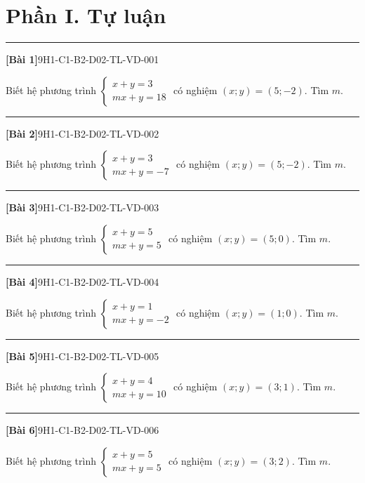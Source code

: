 \documentclass[12pt,a4paper]{article}
\newif\ifloigiai
\newenvironment{cauhoi}[2]{%
  \par\medskip\noindent\rule{\textwidth}{0.4pt}\par\nopagebreak
  \noindent\textbf{[#1]}\hfill{\scriptsize\ttfamily #2}\par\nopagebreak\smallskip}{\par}
\newcommand{\loigiai}[1]{\ifloigiai\par\smallskip\noindent\textit{Lời giải.} #1\par\fi}
\begin{document}
\section*{Phần I. Tự luận}
\begin{cauhoi}{Bài 1}{9H1-C1-B2-D02-TL-VD-001}
Biết hệ phương trình $\begin{cases}x+y=3\\ mx+y=18\end{cases}$ có nghiệm $(x;y)=(5;-2)$. Tìm $m$.
\loigiai{Thay $x=5$, $y=-2$ vào phương trình thứ hai: $5 m-2=18$ nên $m=\dfrac{18+2}{5}=4$.}
\end{cauhoi}
\begin{cauhoi}{Bài 2}{9H1-C1-B2-D02-TL-VD-002}
Biết hệ phương trình $\begin{cases}x+y=3\\ mx+y=-7\end{cases}$ có nghiệm $(x;y)=(5;-2)$. Tìm $m$.
\loigiai{Thay $x=5$, $y=-2$ vào phương trình thứ hai: $5 m-2=-7$ nên $m=\dfrac{-7+2}{5}=-1$.}
\end{cauhoi}
\begin{cauhoi}{Bài 3}{9H1-C1-B2-D02-TL-VD-003}
Biết hệ phương trình $\begin{cases}x+y=5\\ mx+y=5\end{cases}$ có nghiệm $(x;y)=(5;0)$. Tìm $m$.
\loigiai{Thay $x=5$, $y=0$ vào phương trình thứ hai: $5 m+0=5$ nên $m=\dfrac{5-0}{5}=1$.}
\end{cauhoi}
\begin{cauhoi}{Bài 4}{9H1-C1-B2-D02-TL-VD-004}
Biết hệ phương trình $\begin{cases}x+y=1\\ mx+y=-2\end{cases}$ có nghiệm $(x;y)=(1;0)$. Tìm $m$.
\loigiai{Thay $x=1$, $y=0$ vào phương trình thứ hai: $1 m+0=-2$ nên $m=\dfrac{-2-0}{1}=-2$.}
\end{cauhoi}
\begin{cauhoi}{Bài 5}{9H1-C1-B2-D02-TL-VD-005}
Biết hệ phương trình $\begin{cases}x+y=4\\ mx+y=10\end{cases}$ có nghiệm $(x;y)=(3;1)$. Tìm $m$.
\loigiai{Thay $x=3$, $y=1$ vào phương trình thứ hai: $3 m+1=10$ nên $m=\dfrac{10-1}{3}=3$.}
\end{cauhoi}
\begin{cauhoi}{Bài 6}{9H1-C1-B2-D02-TL-VD-006}
Biết hệ phương trình $\begin{cases}x+y=5\\ mx+y=5\end{cases}$ có nghiệm $(x;y)=(3;2)$. Tìm $m$.
\loigiai{Thay $x=3$, $y=2$ vào phương trình thứ hai: $3 m+2=5$ nên $m=\dfrac{5-2}{3}=1$.}
\end{cauhoi}
\end{document}

